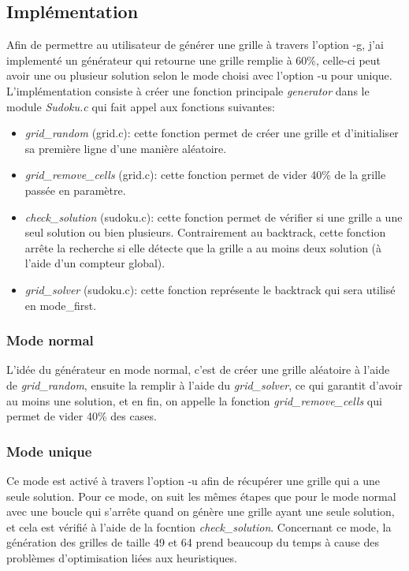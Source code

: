 \documentclass[12pt]{article}
\begin{document}
	\subsection{Implémentation} 
     Afin de permettre au utilisateur de générer une grille à travers l'option -g, j'ai implementé un générateur qui retourne une grille remplie à 60\%, celle-ci peut avoir une ou plusieur solution selon le mode choisi avec l'option -u pour unique.\\
     L'implémentation consiste à créer une fonction principale \textit{generator} dans le module \textit{Sudoku.c} qui fait appel aux fonctions suivantes:
     \begin{itemize}
		\item \textit{grid\_random} (grid.c): cette fonction permet de créer une grille et d'initialiser sa première ligne d'une manière aléatoire.
        \item \textit{grid\_remove\_cells} (grid.c): cette fonction permet de vider 40\% de la grille passée en paramètre.
        \item \textit{check\_solution} (sudoku.c): cette fonction permet de vérifier si une grille a une seul solution ou bien plusieurs. Contrairement au backtrack, cette fonction arrête la recherche si elle détecte que la grille a au moins deux solution (à l'aide d'un compteur global).
        \item \textit{grid\_solver} (sudoku.c): cette fonction représente le backtrack qui sera utilisé en mode\_first.
	\end{itemize}
    \subsubsection{Mode normal}
     L'idée du générateur en mode normal, c'est de créer une grille aléatoire à l'aide de \textit{grid\_random}, ensuite la remplir à l'aide du \textit{grid\_solver}, ce qui garantit d'avoir au moins une solution, et en fin, on appelle la fonction \textit{grid\_remove\_cells} qui permet de vider 40\% des cases.
     \subsubsection{Mode unique}
     Ce mode est activé à travers l'option -u afin de récupérer une grille qui a une seule solution. Pour ce mode, on suit les mêmes étapes que pour le mode normal avec une boucle qui s'arrête quand on génère une grille ayant une seule solution, et cela est vérifié à l'aide de la focntion \textit{check\_solution}. Concernant ce mode, la génération des grilles de taille 49 et 64 prend beaucoup du temps à cause des problèmes d'optimisation liées aux heuristiques.
\end{document}
